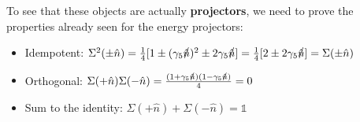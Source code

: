 \documentclass[../main.tex]{subfiles}
\begin{document}
To see that these objects are actually \textbf{projectors}, we need to prove the properties already seen for the energy projectors:
\begin{itemize}
    \item Idempotent: $\Sigma^2(\pm\hat{n})=\frac{1}{4}[1\pm(\gamma_5\slashed{\hat{n}})^2\pm2\gamma_5\slashed{\hat{n}}]=\frac{1}{4}[2\pm2\gamma_5\slashed{\hat{n}}]=\Sigma(\pm\hat{n})$
    \item Orthogonal: $\Sigma(+\hat{n})\Sigma(-\hat{n})=\frac{(1+\gamma_5\slashed{\hat{n}})(1-\gamma_5\slashed{\hat{n}})}{4}=0$
    \item Sum to the identity: $\Sigma(+\hat{n})+\Sigma(-\hat{n})=\mathbb{1}$
\end{itemize}
\end{document}
